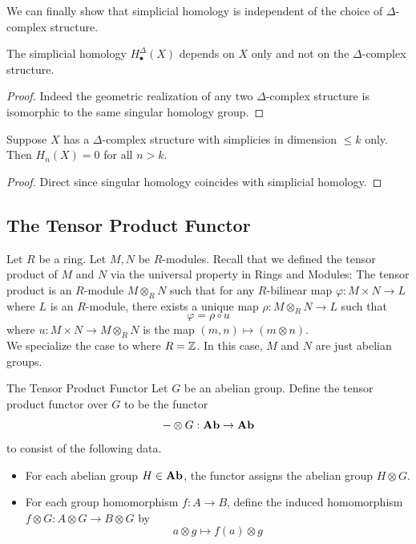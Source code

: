 \documentclass[a4paper]{article}
\begin{document}
We can finally show that simplicial homology is independent of the choice of $\Delta$-complex structure. 

\begin{crl}{}{} The simplicial homology $H_\bullet^\Delta(X)$ depends on $X$ only and not on the $\Delta$-complex structure. \tcbline
\begin{proof}
Indeed the geometric realization of any two $\Delta$-complex structure is isomorphic to the same singular homology group. 
\end{proof}
\end{crl}

\begin{crl}{}{} Suppose $X$ has a $\Delta$-complex structure with simplicies in dimension $\leq k$ only. Then $H_n(X)=0$ for all $n>k$. \tcbline
\begin{proof}
Direct since singular homology coincides with simplicial homology. 
\end{proof}
\end{crl}

\subsection{The Tensor Product Functor}
Let $R$ be a ring. Let $M,N$ be $R$-modules. Recall that we defined the tensor product of $M$ and $N$ via the universal property in Rings and Modules: The tensor product is an $R$-module $M\otimes_RN$ such that for any $R$-bilinear map $\varphi:M\times N\to L$ where $L$ is an $R$-module, there exists a unique map $\rho:M\otimes_RN\to L$ such that $$\varphi=\rho\circ u$$ where $u:M\times N\to M\otimes_RN$ is the map $(m,n)\mapsto(m\otimes n)$. \\

We specialize the case to where $R=\mathbb{Z}$. In this case, $M$ and $N$ are just abelian groups. 

\begin{defn}{The Tensor Product Functor}{} Let $G$ be an abelian group. Define the tensor product functor over $G$ to be the functor $$-\otimes G:\bold{Ab}\to\bold{Ab}$$ to consist of the following data. 
\begin{itemize}
\item For each abelian group $H\in\bold{Ab}$, the functor assigns the abelian group $H\otimes G$. 
\item For each group homomorphism $f:A\to B$, define the induced homomorphism $f\otimes G:A\otimes G\to B\otimes G$ by $$a\otimes g\mapsto f(a)\otimes g$$
\end{itemize}
\end{defn}
\end{document}
